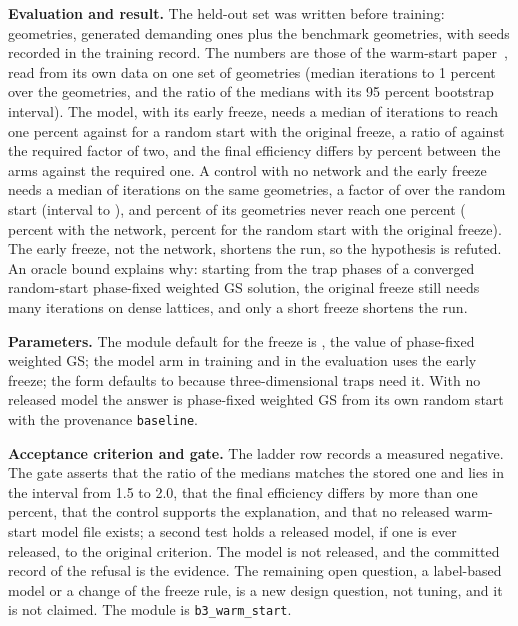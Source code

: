 \textbf{Evaluation and result.} The held-out set was written before training: \wsN{} geometries, generated demanding ones plus the benchmark geometries, with seeds recorded in the training record. The numbers are those of the warm-start paper~\cite{warmpaper}, read from its own data on one set of \wsPaperN{} geometries (median iterations to 1 percent over the geometries, and the ratio of the medians with its 95 percent bootstrap interval). The model, with its early freeze, needs a median of \wsPaperModelIt{} iterations to reach one percent against \wsPaperRandomIt{} for a random start with the original freeze, a ratio of \wsRatio{} against the required factor of two, and the final efficiency differs by \wsPaperEffDiffModel{} percent between the arms against the required one. A control with no network and the early freeze needs a median of \wsPaperControlIt{} iterations on the same geometries, a factor of \wsPaperControlFactor{} over the random start (interval \wsPaperControlFactorLo{} to \wsPaperControlFactorHi{}), and \wsPaperNeverControl{} percent of its geometries never reach one percent (\wsPaperNeverModel{} percent with the network, \wsPaperNeverFull{} percent for the random start with the original freeze). The early freeze, not the network, shortens the run, so the hypothesis is refuted. An oracle bound explains why: starting from the trap phases of a converged random-start phase-fixed weighted GS solution, the original freeze still needs many iterations on dense lattices, and only a short freeze shortens the run.

\textbf{Parameters.} The module default for the freeze is , the value of phase-fixed weighted GS; the model arm in training and in the evaluation uses the early freeze; the form defaults to \texttt{} because three-dimensional traps need it. With no released model the answer is phase-fixed weighted GS from its own random start with the provenance \texttt{baseline}.

\textbf{Acceptance criterion and gate.} The ladder row records a measured negative. The gate asserts that the ratio of the medians matches the stored one and lies in the interval from 1.5 to 2.0, that the final efficiency differs by more than one percent, that the control supports the explanation, and that no released warm-start model file exists; a second test holds a released model, if one is ever released, to the original criterion. The model is not released, and the committed record of the refusal is the evidence. The remaining open question, a label-based model or a change of the freeze rule, is a new design question, not tuning, and it is not claimed. The module is \texttt{b3\_warm\_start}.

